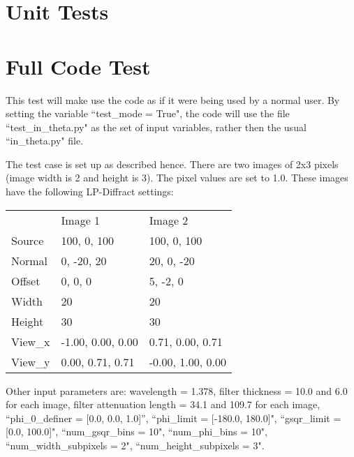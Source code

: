 \documentclass{report}
\begin{document}
\section{Unit Tests}

\section{Full Code Test}

This test will make use the code as if it were being used by a normal user. By setting the variable ``test\_mode = True", the code will use the file ``test\_in\_theta.py" as the set of input variables, rather then the usual ``in\_theta.py" file. 

The test case is set up as described hence. There are two images of 2x3 pixels (image width is 2 and height is 3). The pixel values are set to 1.0. These images have the following LP-Diffract settings:

\begin{table}[h!]
\centering
\begin{tabular}{lll}
        & Image 1           & Image 2           \\
Source  & 100, 0, 100       & 100, 0, 100       \\
Normal  & 0, -20, 20        & 20, 0, -20        \\
Offset  & 0, 0, 0           & 5, -2, 0          \\
Width   & 20                & 20                \\
Height  & 30                & 30                \\
View\_x & -1.00, 0.00, 0.00 & 0.71, 0.00, 0.71  \\
View\_y & 0.00, 0.71, 0.71  & -0.00, 1.00, 0.00
\end{tabular}
\end{table}

Other input parameters are: wavelength = 1.378, filter thickness = 10.0 and 6.0 for each image, filter attenuation length = 34.1 and 109.7 for each image, ``phi\_0\_definer = [0.0, 0.0, 1.0]'', ``phi\_limit = [-180.0, 180.0]", ``gsqr\_limit = [0.0, 100.0]", ``num\_gsqr\_bins = 10", ``num\_phi\_bins = 10", ``num\_width\_subpixels = 2", ``num\_height\_subpixels = 3". 
\end{document}
